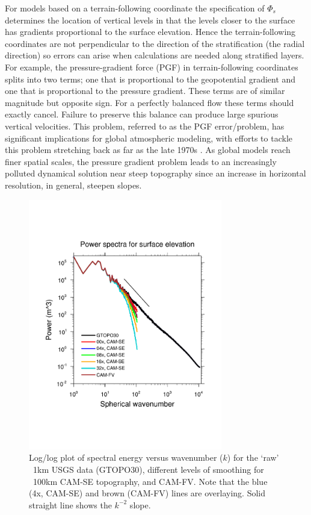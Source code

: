 \documentclass[gmd]{copernicus}
\begin{document}
For models based on a terrain-following coordinate the specification of $\Phi_s$ determines the location of vertical levels in that the levels closer to the surface has gradients proportional to the surface elevation. Hence the terrain-following coordinates are not perpendicular to the direction of the stratification (the radial direction) so errors can arise when calculations are needed along stratified layers. For example, the pressure-gradient force (PGF) in terrain-following coordinates splits into two terms; one that is proportional to the geopotential gradient and one that is proportional to the pressure gradient. These terms are of similar magnitude but opposite sign. For a perfectly balanced flow these terms should exactly cancel. Failure to preserve this balance can produce large spurious vertical velocities. This problem, referred to as the PGF error/problem, has significant implications for global atmospheric modeling, with efforts to tackle this problem stretching back as far as the late 1970s \citep{ZIJ1977BzPdA, DTMZIJ1986MAP}.  As global models reach finer spatial scales, the pressure gradient problem leads to an increasingly polluted dynamical solution near steep topography since an increase in horizontal resolution, in general, steepen slopes. 
\begin{figure}[tb]
\center\includegraphics[width=20pc,angle=0]{fig/tke-topo.pdf}
  \caption{Log/log plot of spectral energy versus wavenumber ($k$) for the `raw' ~1km USGS data (GTOPO30), different levels of smoothing for ~100km CAM-SE topography, and CAM-FV. Note that the blue (4x, CAM-SE) and brown (CAM-FV) lines are overlaying. Solid straight line shows the $k^{-2}$ slope.{\color{red}{0x,4x,8x,... not explained yet}}}\label{fig:tke-topo}
\end{figure} 
\end{document}
